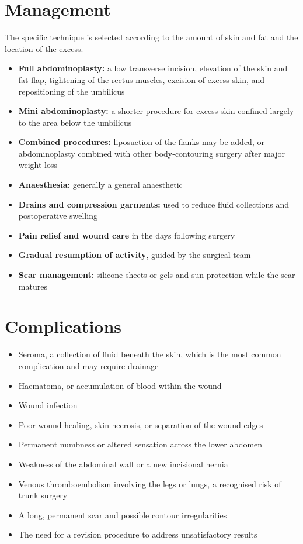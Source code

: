 \section*{Management}
The specific technique is selected according to the amount of skin and fat and the location of the excess.

\begin{itemize}
    \item \textbf{Full abdominoplasty:} a low transverse incision, elevation of the skin and fat flap, tightening of the rectus muscles, excision of excess skin, and repositioning of the umbilicus
    \item \textbf{Mini abdominoplasty:} a shorter procedure for excess skin confined largely to the area below the umbilicus
    \item \textbf{Combined procedures:} liposuction of the flanks may be added, or abdominoplasty combined with other body-contouring surgery after major weight loss
    \item \textbf{Anaesthesia:} generally a general anaesthetic
    \item \textbf{Drains and compression garments:} used to reduce fluid collections and postoperative swelling
    \item \textbf{Pain relief and wound care} in the days following surgery
    \item \textbf{Gradual resumption of activity}, guided by the surgical team
    \item \textbf{Scar management:} silicone sheets or gels and sun protection while the scar matures
\end{itemize}

\section*{Complications}
\begin{itemize}
    \item Seroma, a collection of fluid beneath the skin, which is the most common complication and may require drainage
    \item Haematoma, or accumulation of blood within the wound
    \item Wound infection
    \item Poor wound healing, skin necrosis, or separation of the wound edges
    \item Permanent numbness or altered sensation across the lower abdomen
    \item Weakness of the abdominal wall or a new incisional hernia
    \item Venous thromboembolism involving the legs or lungs, a recognised risk of trunk surgery
    \item A long, permanent scar and possible contour irregularities
    \item The need for a revision procedure to address unsatisfactory results
\end{itemize}

